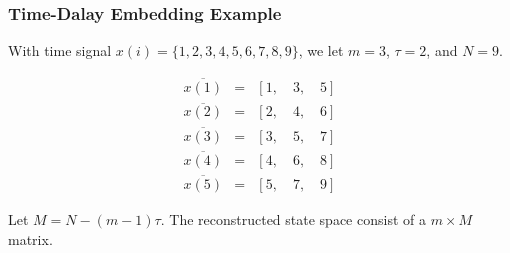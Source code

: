 \documentclass{beamer}
\theoremstyle{definition}
\begin{document}
% 



\begin{frame}
\frametitle{Time-Dalay Embedding Example}

With time signal $x(i) = \{ 1,2,3,4,5,6,7,8,9 \} $, we let $m=3$, $\tau=2$, and $N=9$.


\begin{eqnarray*} %
\overline{x(1)} &=& [ 1, \quad 3, \quad 5] \\
\overline{x(2)} &=& [ 2, \quad 4, \quad 6] \\
\overline{x(3)} &=& [ 3, \quad 5, \quad 7] \\
\overline{x(4)} &=& [ 4, \quad 6, \quad 8] \\
\overline{x(5)} &=& [ 5, \quad 7, \quad 9] 
\end{eqnarray*}

Let $M = N-(m-1)\tau$. The reconstructed state space consist of
a $m \times M$ matrix.


\end{frame}
\end{document}
